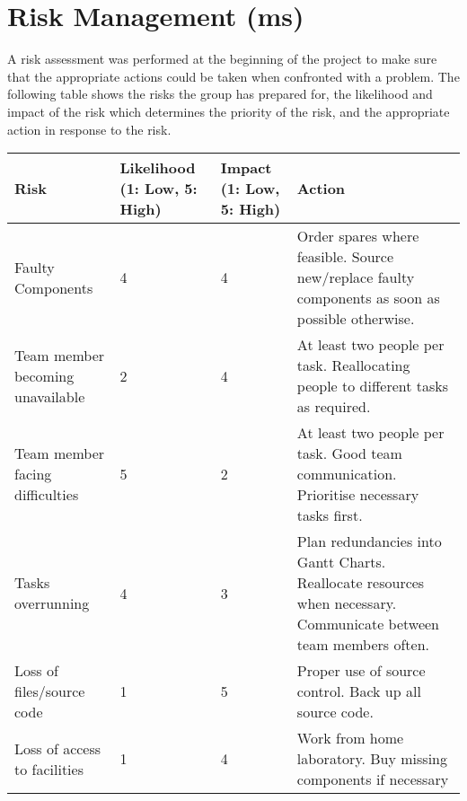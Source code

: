 
\section{Risk Management (ms)}

A risk assessment was performed at the beginning of the project to make sure that the appropriate actions could be taken when confronted with a problem. 
The following table shows the risks the group has prepared for, the likelihood and 
impact of the risk which determines the priority of the risk, and the appropriate action in response to the risk.

\begin{center}
	\begin{tabular}{ | p{4cm} | p{2cm} | p{2cm} | p{5cm} | }
	\hline
	\textbf{Risk} & \textbf{Likelihood (1: Low, 5: High)} & 
	\textbf{Impact (1: Low, 5: High)} & \textbf{Action} \\ \hline
	Faulty Components & 4 & 4 & Order spares where feasible.
	Source new/replace faulty components as soon as possible otherwise. \\ \hline
	Team member becoming unavailable & 2 & 4 & At least two people per task.
	Reallocating people to different tasks as required. \\ \hline
	Team member facing difficulties & 5 & 2 & At least two people per task.
	Good team communication. Prioritise necessary tasks first. \\ \hline
	Tasks overrunning & 4 & 3 & Plan redundancies into Gantt Charts.
	Reallocate resources when necessary. Communicate between team members often. \\ \hline
	Loss of files/source code & 1 & 5 & Proper use of source control. Back up all source code. \\ \hline
	Loss of access to facilities & 1 & 4 & Work from home laboratory. 
	Buy missing components if necessary \\
	\hline
	\end{tabular}
\end{center}

